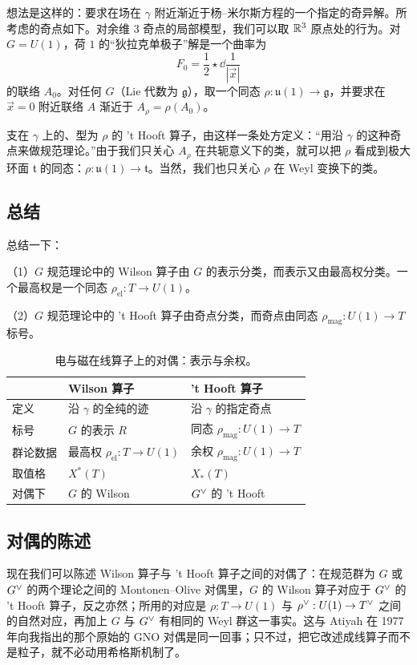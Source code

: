 想法是这样的：要求在场在 $\gamma$ 附近渐近于杨--米尔斯方程的一个指定的奇异解。所考虑的奇点如下。对余维 $3$ 奇点的局部模型，我们可以取 $\mathbb{R}^3$ 原点处的行为。对 $G=U(1)$，荷 $1$ 的“狄拉克单极子”解是一个曲率为
\[
  F_0=\frac{1}{2}\star\dd\frac{1}{|\vec x|}
\]
的联络 $A_0$。对任何 $G$（Lie 代数为 $\mathfrak g$），取一个同态 $\rho:\mathfrak u(1)\to\mathfrak g$，并要求在 $\vec x=0$ 附近联络 $A$ 渐近于 $A_\rho=\rho(A_0)$。

支在 $\gamma$ 上的、型为 $\rho$ 的 't Hooft 算子，由这样一条处方定义：“用沿 $\gamma$ 的这种奇点来做规范理论。”由于我们只关心 $A_\rho$ 在共轭意义下的类，就可以把 $\rho$ 看成到极大环面 $\mathfrak t$ 的同态：$\rho:\mathfrak u(1)\to\mathfrak t$。当然，我们也只关心 $\rho$ 在 Weyl 变换下的类。

\subsection{总结}

总结一下：

（1）$G$ 规范理论中的 Wilson 算子由 $G$ 的表示分类，而表示又由最高权分类。一个最高权是一个同态 $\rho_{\mathrm{el}}:T\to U(1)$。

（2）$G$ 规范理论中的 't Hooft 算子由奇点分类，而奇点由同态 $\rho_{\mathrm{mag}}:U(1)\to T$ 标号。

\begin{table}[htbp]
\centering\small
\caption{电与磁在线算子上的对偶：表示与余权。}
\label{tab:line-ops}
\begin{tabular}{@{}lll@{}}
\toprule
 & Wilson 算子 & 't Hooft 算子 \\
\midrule
定义 & 沿 $\gamma$ 的全纯的迹 & 沿 $\gamma$ 的指定奇点 \\
标号 & $G$ 的表示 $R$ & 同态 $\rho_{\mathrm{mag}}:U(1)\to T$ \\
群论数据 & 最高权 $\rho_{\mathrm{el}}:T\to U(1)$ & 余权 $\rho_{\mathrm{mag}}:U(1)\to T$ \\
取值格 & $X^*(T)$ & $X_*(T)$ \\
对偶下 & $G$ 的 Wilson & $G^{\vee}$ 的 't Hooft \\
\bottomrule
\end{tabular}
\end{table}

\subsection{对偶的陈述}

现在我们可以陈述 Wilson 算子与 't Hooft 算子之间的对偶了：在规范群为 $G$ 或 $G^{\vee}$ 的两个理论之间的 Montonen--Olive 对偶里，$G$ 的 Wilson 算子对应于 $G^{\vee}$ 的 't Hooft 算子，反之亦然；所用的对应是 $\rho:T\to U(1)$ 与 $\rho^\vee:U(1)\to T^{\vee}$ 之间的自然对应，再加上 $G$ 与 $G^{\vee}$ 有相同的 Weyl 群这一事实。这与 Atiyah 在 1977 年向我指出的那个原始的 GNO 对偶是同一回事；只不过，把它改述成线算子而不是粒子，就不必动用希格斯机制了。

